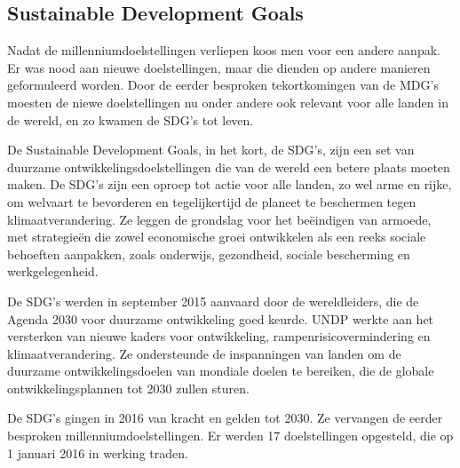 \subsection{Sustainable Development Goals}
Nadat de millenniumdoelstellingen verliepen koos men voor een andere aanpak. Er was nood aan nieuwe doelstellingen, maar die dienden op andere manieren geformuleerd worden. Door de eerder besproken tekortkomingen van de MDG's moesten de niewe doelstellingen nu onder andere ook relevant voor alle landen in de wereld, en zo kwamen de SDG's tot leven.  \autocite{VN2015}

De Sustainable Development Goals, in het kort, de SDG's, zijn een set van duurzame ontwikkelingsdoelstellingen die van de wereld een betere plaats moeten maken. De SDG’s zijn een oproep tot actie voor alle landen, zo wel arme en rijke, om welvaart te bevorderen en tegelijkertijd de planeet te beschermen tegen klimaatverandering. Ze leggen de grondslag voor het beëindigen van armoede, met strategieën die zowel economische groei ontwikkelen als een reeks sociale behoeften aanpakken, zoals onderwijs, gezondheid, sociale bescherming en werkgelegenheid. \autocite{VerenigdeNaties2004}


De SDG's werden in september 2015 aanvaard door de wereldleiders, die de Agenda 2030 voor duurzame ontwikkeling goed keurde. UNDP werkte aan het versterken van nieuwe kaders voor ontwikkeling, rampenrisicovermindering en klimaatverandering. Ze ondersteunde de inspanningen van landen om de duurzame ontwikkelingsdoelen van mondiale doelen te bereiken, die de globale ontwikkelingsplannen tot 2030 zullen sturen.

De SDG's gingen in 2016 van kracht en gelden tot 2030. Ze vervangen de eerder besproken millenniumdoelstellingen. Er werden 17 doelstellingen opgesteld, die op 1 januari 2016 in werking traden. \autocite{DevelopmentProgram2020}
 
